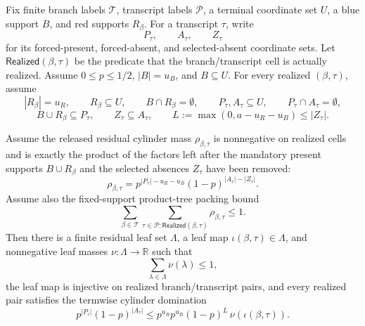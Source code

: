 \begin{helper}
Fix finite branch labels \(\mathcal T\), transcript labels \(\mathcal P\),
a terminal coordinate set \(U\), a blue support \(B\), and red supports
\(R_\beta\).  For a transcript \(\tau\), write
\[
P_\tau,\qquad A_\tau,\qquad Z_\tau
\]
for its forced-present, forced-absent, and selected-absent coordinate sets.
Let \(\mathsf{Realized}(\beta,\tau)\) be the predicate that the
branch/transcript cell is actually realized.  Assume \(0\le p\le 1/2\),
\(|B|=u_B\), and \(B\subseteq U\).  For every realized
\((\beta,\tau)\), assume
\[
|R_\beta|=u_R,\qquad R_\beta\subseteq U,\qquad
B\cap R_\beta=\emptyset,\qquad
P_\tau,A_\tau\subseteq U,\qquad P_\tau\cap A_\tau=\emptyset,
\]
\[
B\cup R_\beta\subseteq P_\tau,\qquad Z_\tau\subseteq A_\tau,\qquad
L:=\max(0,a-u_R-u_B)\le |Z_\tau|.
\]

Assume the released residual cylinder mass
\(\rho_{\beta,\tau}\) is nonnegative on realized cells and is exactly the
product of the factors left after the mandatory present supports
\(B\cup R_\beta\) and the selected absences \(Z_\tau\) have been removed:
\[
\rho_{\beta,\tau}
=p^{|P_\tau|-u_R-u_B}(1-p)^{|A_\tau|-|Z_\tau|}.
\]
Assume also the fixed-support product-tree packing bound
\[
\sum_{\beta\in\mathcal T}
  \sum_{\tau\in\mathcal P:\mathsf{Realized}(\beta,\tau)}
    \rho_{\beta,\tau}\le 1.
\]
Then there is a finite residual leaf set \(\Lambda\), a leaf map
\(\iota(\beta,\tau)\in\Lambda\), and nonnegative leaf masses
\(\nu:\Lambda\to\mathbb R\) such that
\[
\sum_{\lambda\in\Lambda}\nu(\lambda)\le1,
\]
the leaf map is injective on realized branch/transcript pairs, and every
realized pair satisfies the termwise cylinder domination
\[
p^{|P_\tau|}(1-p)^{|A_\tau|}
\le
p^{u_R}p^{u_B}(1-p)^L\,\nu(\iota(\beta,\tau)).
\]
\end{helper}
